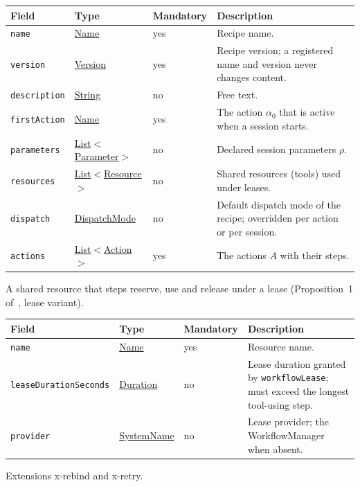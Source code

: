 \documentclass[a4paper]{arrowhead}
\newcommand{\mref}[1]{{\textcolor{ArrowheadPurple}{\hyperref[sec:model:#1]{#1}}}}
\newcommand{\pref}[1]{{\textcolor{ArrowheadGrey}{\hyperref[sec:model:primitives:#1]{#1}}}}
\begin{document}
{\small
\begin{longtable}{|p{3.7cm}|p{4.2cm}|p{1.6cm}|p{6.3cm}|}

\hline
\rowcolor{gray!33} Field & Type & Mandatory & Description \\ \hline
\endhead
\texttt{name} & \pref{Name} & yes & Recipe name. \\ \hline
\texttt{version} & \pref{Version} & yes & Recipe version; a registered name and version never changes content. \\ \hline
\texttt{description} & \pref{String} & no & Free text. \\ \hline
\texttt{firstAction} & \pref{Name} & yes & The action $\alpha_0$ that is active when a session starts. \\ \hline
\texttt{parameters} & \pref{List}$<$\mref{Parameter}$>$ & no & Declared session parameters $\rho$. \\ \hline
\texttt{resources} & \pref{List}$<$\mref{Resource}$>$ & no & Shared resources (tools) used under leases. \\ \hline
\texttt{dispatch} & \mref{DispatchMode} & no & Default dispatch mode of the recipe; overridden per action or per session. \\ \hline
\texttt{actions} & \pref{List}$<$\mref{Action}$>$ & yes & The actions $A$ with their steps. \\ \hline
\end{longtable}
}

A shared resource that steps reserve, use and release under a lease (Proposition~1 of~\cite{varga2026}, lease variant).

{\small
\begin{longtable}{|p{3.7cm}|p{4.2cm}|p{1.6cm}|p{6.3cm}|}

\hline
\rowcolor{gray!33} Field & Type & Mandatory & Description \\ \hline
\endhead
\texttt{name} & \pref{Name} & yes & Resource name. \\ \hline
\texttt{lease\allowbreak{}Duration\allowbreak{}Seconds} & \pref{Duration} & no & Lease duration granted by \texttt{workflowLease}; must exceed the longest tool-using step. \\ \hline
\texttt{provider} & \pref{SystemName} & no & Lease provider; the WorkflowManager when absent. \\ \hline
\end{longtable}
}

Extensions x-rebind and x-retry.
\end{document}
